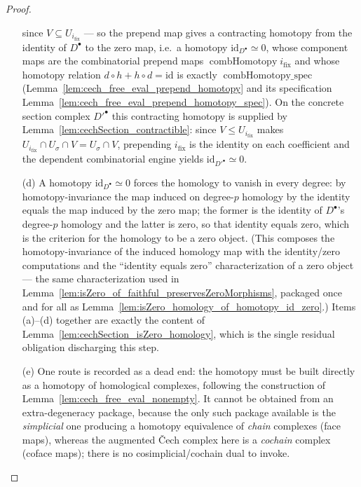\begin{proof}
\begin{enumerate}
      since \(V \subseteq U_{i_{\mathrm{fix}}}\) --- so the prepend map gives a contracting homotopy from the
      identity of \(D^\bullet\) to the zero map, i.e.\ a homotopy \(\mathrm{id}_{D^\bullet} \simeq 0\), whose
      component maps are the combinatorial prepend maps \(\operatorname{combHomotopy} i_{\mathrm{fix}}\) and
      whose homotopy relation \(d \circ h + h \circ d = \mathrm{id}\) is exactly
      \(\operatorname{combHomotopy\_spec}\) (Lemma~\ref{lem:cech_free_eval_prepend_homotopy} and its
      specification Lemma~\ref{lem:cech_free_eval_prepend_homotopy_spec}). On the concrete section complex
      \(D'^\bullet\) this contracting homotopy is supplied by Lemma~\ref{lem:cechSection_contractible}:
      since \(V \le U_{i_{\mathrm{fix}}}\) makes \(U_{i_{\mathrm{fix}}} \cap U_\sigma \cap V = U_\sigma \cap
      V\), prepending \(i_{\mathrm{fix}}\) is the identity on each coefficient and the dependent
      combinatorial engine yields \(\mathrm{id}_{D'^\bullet} \simeq 0\).
    \item[(d)] A homotopy \(\mathrm{id}_{D^\bullet} \simeq 0\) forces the homology to vanish in every degree:
      by homotopy-invariance the map induced on degree-\(p\) homology by the identity equals the map induced
      by the zero map; the former is the identity of \(D^\bullet\)'s degree-\(p\) homology and the latter is
      zero, so that identity equals zero, which is the criterion for the homology to be a zero object. (This
      composes the homotopy-invariance of the induced homology map with the identity/zero computations and
      the ``identity equals zero'' characterization of a zero object --- the same characterization used in
      Lemma~\ref{lem:isZero_of_faithful_preservesZeroMorphisms}, packaged once and for all as
      Lemma~\ref{lem:isZero_homology_of_homotopy_id_zero}.) Items (a)--(d) together are exactly the content
      of Lemma~\ref{lem:cechSection_isZero_homology}, which is the single residual obligation discharging
      this step.
    \item[(e)] One route is recorded as a dead end: the homotopy must be built directly as a homotopy of
      homological complexes, following the construction of
      Lemma~\ref{lem:cech_free_eval_nonempty}. It cannot be obtained from an extra-degeneracy package,
      because the only such package available is the \emph{simplicial} one producing a homotopy equivalence
      of \emph{chain} complexes (face maps), whereas the augmented {\v C}ech complex here is a \emph{cochain}
      complex (coface maps); there is no cosimplicial/cochain dual to invoke.
  \end{enumerate}


\end{proof}
